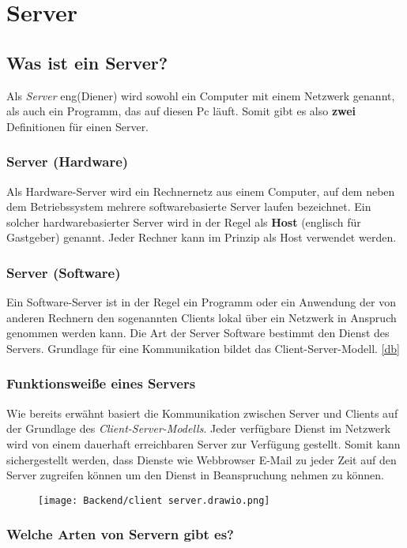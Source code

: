 \section{Server}

\subsection{Was ist ein Server?}
Als \textit{Server} eng(Diener) wird sowohl ein Computer mit einem Netzwerk genannt,
als auch ein Programm, das auf diesen Pc läuft. Somit gibt es also \textbf{zwei} Definitionen
für einen Server.

\subsubsection{Server (Hardware)}
Als Hardware-Server wird ein Rechnernetz aus einem Computer, auf dem neben dem Betriebssystem
mehrere softwarebasierte Server laufen bezeichnet. Ein solcher hardwarebasierter
Server wird in der Regel als \textbf{Host} (englisch für Gastgeber) genannt. Jeder Rechner kann
im Prinzip als Host verwendet
werden.

\subsubsection{Server (Software)}
Ein Software-Server ist in der Regel ein Programm oder ein Anwendung
der von anderen Rechnern den sogenannten Clients lokal über ein Netzwerk in Anspruch genommen
werden kann. Die Art der Server Software bestimmt den Dienst des Servers. Grundlage für
eine Kommunikation bildet das Client-Server-Modell. \ref{db}

\subsubsection{Funktionsweiße eines Servers}
Wie bereits erwähnt basiert die Kommunikation zwischen Server und Clients
auf der Grundlage des \textit{Client-Server-Modells}. Jeder verfügbare Dienst im Netzwerk wird von
einem dauerhaft erreichbaren Server zur Verfügung gestellt. Somit kann sichergestellt werden, dass
Dienste wie Webbrowser E-Mail zu jeder Zeit auf den Server zugreifen können um den Dienst
in Beanspruchung nehmen zu können.

\begin{figure}[H]
    \centering
    \texttt{[image: Backend/client server.drawio.png]}
\end{figure}
\subsubsection{Welche Arten von Servern gibt es?}
